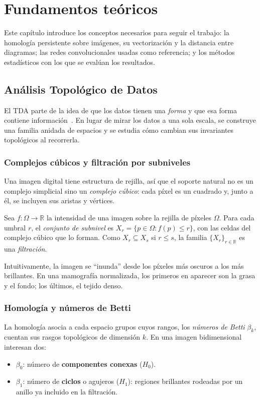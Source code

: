 \chapter{Fundamentos teóricos}
\label{cap:fundamentos}

Este capítulo introduce los conceptos necesarios para seguir el trabajo: la
homología persistente sobre imágenes, su vectorización y la distancia entre
diagramas; las redes convolucionales usadas como referencia; y los métodos
estadísticos con los que se evalúan los resultados.

\section{Análisis Topológico de Datos}
El TDA parte de la idea de que los datos tienen una \emph{forma} y que esa
forma contiene información~\cite{carlsson2009topology}. En lugar de mirar los
datos a una sola escala, se construye una familia anidada de espacios y se
estudia cómo cambian sus invariantes topológicos al recorrerla.

\subsection{Complejos cúbicos y filtración por subniveles}
Una imagen digital tiene estructura de rejilla, así que el soporte natural no
es un complejo simplicial sino un \emph{complejo cúbico}: cada píxel es un
cuadrado y, junto a él, se incluyen sus aristas y vértices.

\begin{definicion}
Sea $f\colon \Omega \to \mathbb{R}$ la intensidad de una imagen sobre la
rejilla de píxeles $\Omega$. Para cada umbral $r$, el \emph{conjunto de
subnivel} es $X_r = \{p \in \Omega : f(p) \le r\}$, con las celdas del
complejo cúbico que lo forman. Como $X_r \subseteq X_s$ si $r \le s$, la
familia $\{X_r\}_{r \in \mathbb{R}}$ es una \emph{filtración}.
\end{definicion}

Intuitivamente, la imagen se ``inunda'' desde los píxeles más oscuros a los
más brillantes. En una mamografía normalizada, los primeros en aparecer son
la grasa y el fondo; los últimos, el tejido denso.

\subsection{Homología y números de Betti}
La homología asocia a cada espacio grupos cuyos rangos, los \emph{números de
Betti} $\beta_k$, cuentan sus rasgos topológicos de dimensión $k$. En una
imagen bidimensional interesan dos:
\begin{itemize}
  \item $\beta_0$: número de \textbf{componentes conexas} ($H_0$).
  \item $\beta_1$: número de \textbf{ciclos} o agujeros ($H_1$): regiones
        brillantes rodeadas por un anillo ya incluido en la filtración.
\end{itemize}

